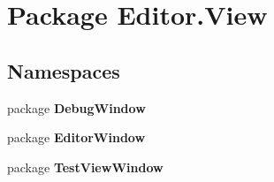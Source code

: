 \section{Package Editor.\-View}
\label{namespace_editor_1_1_view}
\subsection*{Namespaces}
\begin{DoxyCompactItemize}
\item 
package {\bf Debug\-Window}
\item 
package {\bf Editor\-Window}
\item 
package {\bf Test\-View\-Window}
\end{DoxyCompactItemize}
